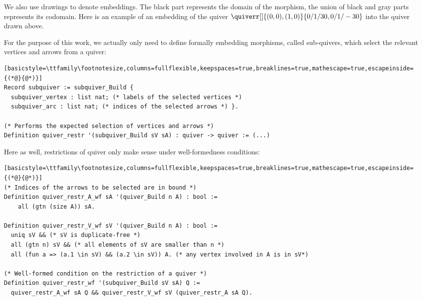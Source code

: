 \documentclass[10pt,a4paper]{article}
\renewcommand{\~}{\widetilde}
\newcommand{\Qcobimap}[1][1]{{\quiverr[#1]{(0,0),(1,0)}{0/1/30,0/1/-30}}}
\begin{document}
We also use drawings to denote embeddings. The black part represents the domain of the morphism, the union of black and gray parts represents its codomain. Here is an example of an embedding of the quiver $\Qcobimap[]$ into the quiver drawn above.
\begin{center}
\end{center}

For the purpose of this work, we actually only need to define formally embedding morphisms, called sub-quivers, which select the relevant vertices and arrows from a quiver:
\begin{lstlisting}[basicstyle=\ttfamily\footnotesize,columns=fullflexible,keepspaces=true,breaklines=true,mathescape=true,escapeinside={(*@}{@*)}]
Record subquiver := subquiver_Build {
  subquiver_vertex : list nat; (* labels of the selected vertices *)
  subquiver_arc : list nat; (* indices of the selected arrows *) }.

(* Performs the expected selection of vertices and arrows *)
Definition quiver_restr '(subquiver_Build sV sA) : quiver -> quiver := (...)
\end{lstlisting}

Here as well, restrictions of quiver only make sense under well-formedness conditions:
\begin{lstlisting}[basicstyle=\ttfamily\footnotesize,columns=fullflexible,keepspaces=true,breaklines=true,mathescape=true,escapeinside={(*@}{@*)}]
(* Indices of the arrows to be selected are in bound *)
Definition quiver_restr_A_wf sA '(quiver_Build n A) : bool :=
    all (gtn (size A)) sA.

Definition quiver_restr_V_wf sV '(quiver_Build n A) : bool :=
  uniq sV && (* sV is duplicate-free *)
  all (gtn n) sV && (* all elements of sV are smaller than n *)
  all (fun a => (a.1 \in sV) && (a.2 \in sV)) A. (* any vertex involved in A is in sV*)

(* Well-formed condition on the restriction of a quiver *)
Definition quiver_restr_wf '(subquiver_Build sV sA) Q :=
  quiver_restr_A_wf sA Q && quiver_restr_V_wf sV (quiver_restr_A sA Q).
\end{lstlisting}
\end{document}
